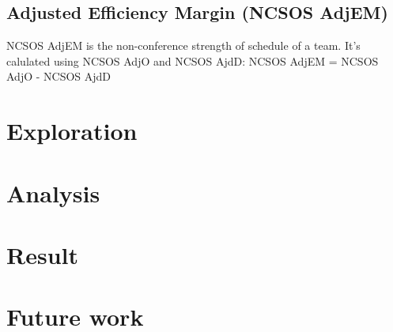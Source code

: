 \documentclass[
10pt, %
a4paper, %
oneside, %
headinclude,footinclude, %
BCOR5mm, %
]{scrartcl}
\begin{document}
\begin{description}
\begin{description}
	\subsection{Adjusted Efficiency Margin (NCSOS AdjEM)}
	\begin{description}
		NCSOS AdjEM is the non-conference strength of schedule of a team.
		It's calulated using NCSOS AdjO and NCSOS AjdD:
		NCSOS AdjEM = NCSOS AdjO - NCSOS AjdD
	\end{description}
\end{description}

\end{description}


\section{Exploration}


\section{Analysis}


\section{Result}


\section{Future work}




\end{document}
